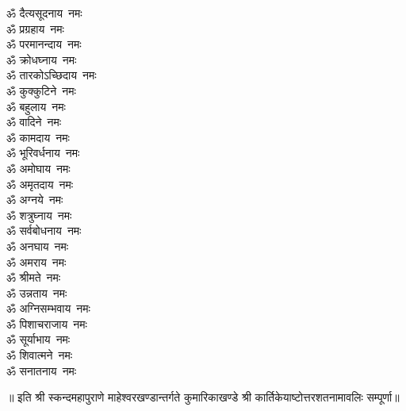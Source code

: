 \begin{multicols}{2}
\begin{flushleft}
ॐ दैत्यसूदनाय~नमः\\
ॐ प्रग्रहाय~नमः\\
ॐ परमानन्दाय~नमः\\
ॐ क्रोधघ्नाय~नमः\\
ॐ तारकोऽच्छिदाय~नमः\\
ॐ कुक्कुटिने~नमः\hfill{}\\
ॐ बहुलाय~नमः\\
ॐ वादिने~नमः\\
ॐ कामदाय~नमः\\
ॐ भूरिवर्धनाय~नमः\\
ॐ अमोघाय~नमः\\
ॐ अमृतदाय~नमः\\
ॐ अग्नये~नमः\\
ॐ शत्रुघ्नाय~नमः\\
ॐ सर्वबोधनाय~नमः\\
ॐ अनघाय~नमः\hfill{}\\
ॐ अमराय~नमः\\
ॐ श्रीमते~नमः\\
ॐ उन्नताय~नमः\\
ॐ अग्निसम्भवाय~नमः\\
ॐ पिशाचराजाय~नमः\\
ॐ सूर्याभाय~नमः\\
ॐ शिवात्मने~नमः\\
ॐ सनातनाय~नमः\\
\end{flushleft}
\end{multicols}
॥ इति श्री स्कन्दमहापुराणे माहेश्वरखण्डान्तर्गते कुमारिकाखण्डे श्री कार्तिकेयाष्टोत्तरशतनामावलिः सम्पूर्णा॥
